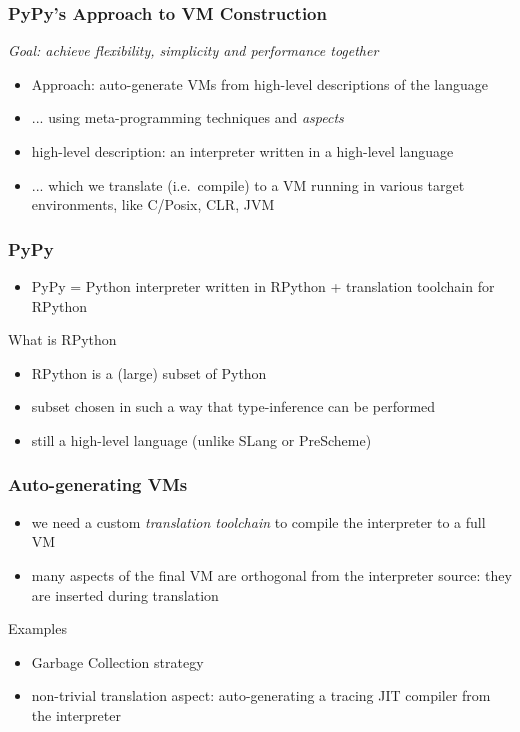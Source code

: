 \documentclass[utf8x]{beamer}
\begin{document}
\begin{frame}
  \frametitle{PyPy's Approach to VM Construction}
  \emph{Goal: achieve flexibility, simplicity and performance together}

  \begin{itemize}
  \item Approach: auto-generate VMs from high-level descriptions of the language
  \item ... using meta-programming techniques and \emph{aspects}
  \item high-level description: an interpreter written in a high-level language
  \item ... which we translate (i.e.\ compile) to a VM running in various target
    environments, like C/Posix\pause, CLR, JVM
  \end{itemize}
\end{frame}

\begin{frame}
  \frametitle{PyPy}
  \begin{itemize}
  \item PyPy = Python interpreter written in RPython + translation toolchain
    for RPython
  \end{itemize}
  \pause
  \begin{block}{What is RPython}
    \begin{itemize}
    \item RPython is a (large) subset of Python
    \item subset chosen in such a way that type-inference can be performed
    \item still a high-level language (unlike SLang or PreScheme)
    \end{itemize}
  \end{block}
\end{frame}

\begin{frame}
  \frametitle{Auto-generating VMs}
  \begin{itemize}
  \item we need a custom \emph{translation toolchain} to compile the interpreter
    to a full VM
  \item many aspects of the final VM are orthogonal from the interpreter source:
    they are inserted during translation
  \end{itemize}
  \pause
  \begin{block}{
    Examples}
    \begin{itemize}
    \item Garbage Collection strategy
    \item non-trivial translation aspect: auto-generating a tracing JIT compiler from
      the interpreter
    \end{itemize}
  \end{block}
\end{frame}
\end{document}
